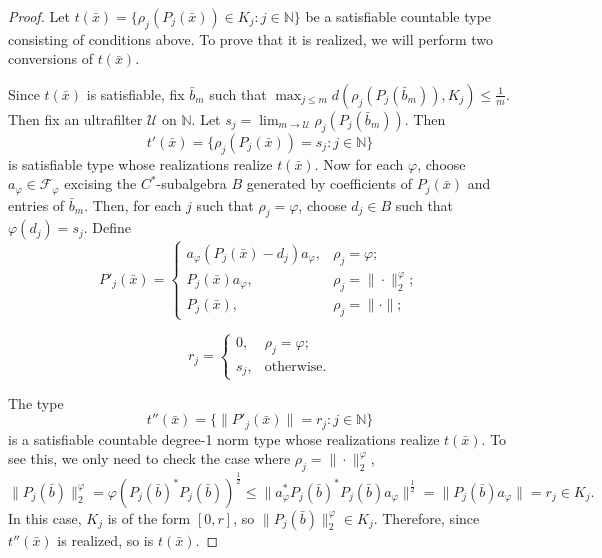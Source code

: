 \documentclass[10pt,a4paper]{amsart}
\newcommand{\Fp}{\mathscr{F}_\varphi}
\newcommand{\U}{\mathscr{U}}
\begin{document}
\begin{proof}
    Let $t(\bar{x})=\{\rho_j(P_j(\bar{x}))\in K_j:j\in\mathbb{N}\}$ be a satisfiable countable type consisting of conditions above. To prove that it is realized, we will perform two conversions of $t(\bar{x})$.
    
    Since $t(\bar{x})$ is satisfiable, fix $\bar{b}_m$ such that $\max_{j\leq m}d(\rho_j(P_j(\bar{b}_m)),K_j)\leq\frac{1}{m}$. Then fix an ultrafilter $\U$ on $\mathbb{N}$. Let $s_j=\lim_{m\rightarrow\U}\rho_j(P_j(\bar{b}_m))$. Then
    \[t'(\bar{x})=\{\rho_j(P_j(\bar{x}))=s_j:j\in\mathbb{N}\}\]
    is satisfiable type whose realizations realize $t(\bar{x})$. Now for each $\varphi$, choose $a_\varphi\in\Fp$ excising the $C^*$-subalgebra $B$ generated by coefficients of $P_j(\bar{x})$ and entries of $\bar{b}_m$. Then, for each $j$ such that $\rho_j=\varphi$, choose $d_j\in B$ such that $\varphi(d_j)=s_j$. Define
    \[P'_j(\bar{x}) = \begin{cases} 
        a_\varphi(P_j(\bar{x})-d_j)a_\varphi, & \rho_j=\varphi; \\
        P_j(\bar{x})a_\varphi, & \rho_j=\|\cdot\|_2^\varphi; \\
        P_j(\bar{x}), & \rho_j=\|\cdot\|;
   \end{cases}\]

   \[r_j = \begin{cases} 
        0, & \rho_j=\varphi; \\
        s_j, & \text{otherwise}.
   \end{cases}\]
   
   The type
   \[t''(\bar{x})=\{\|P'_j(\bar{x})\|=r_j:j\in\mathbb{N}\}\]
   is a satisfiable countable degree-1 norm type whose realizations realize $t(\bar{x})$. To see this, we only need to check the case where $\rho_j=\|\cdot\|_2^\varphi$,
   \[\|P_j(\bar{b})\|_2^\varphi=\varphi(P_j(\bar{b})^*P_j(\bar{b}))^\frac{1}{2}\leq\|a_\varphi^*P_j(\bar{b})^*P_j(\bar{b})a_\varphi\|^\frac{1}{2}=\|P_j(\bar{b})a_\varphi\|=r_j\in K_j.\]
   In this case, $K_j$ is of the form $[0,r]$, so $\|P_j(\bar{b})\|^\varphi_2\in K_j$.
   Therefore, since $t''(\bar{x})$ is realized, so is $t(\bar{x})$.
\end{proof}
\end{document}
